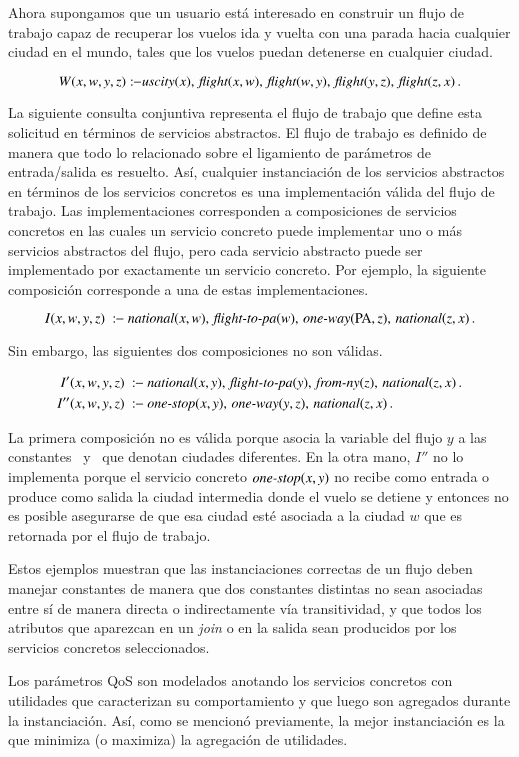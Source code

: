 Ahora supongamos que un usuario está interesado en construir un flujo de trabajo
capaz de recuperar los vuelos ida y vuelta con una parada hacia cualquier ciudad
en el mundo, tales que los vuelos puedan detenerse en cualquier ciudad.

\[ W(x,w,y,z) :\!\!- \text{\it uscity}(x),\,\text{\it flight}(x,w),\,\text{\it flight}(w,y),\,\text{\it flight}(y,z),\,\text{\it flight}(z,x)\,. \]

La siguiente consulta conjuntiva representa el flujo de trabajo que define esta
solicitud en términos de servicios abstractos. El flujo de trabajo es definido
de manera que todo lo relacionado sobre el ligamiento de parámetros de
entrada/salida es resuelto. Así, cualquier instanciación de los servicios
abstractos en términos de los servicios concretos es una implementación válida
del flujo de trabajo. Las implementaciones corresponden a composiciones de
servicios concretos en las cuales un servicio concreto puede implementar uno o
más servicios abstractos del flujo, pero cada servicio abstracto puede ser
implementado por exactamente un servicio concreto. Por ejemplo, la siguiente
composición corresponde a una de estas implementaciones.

\[ I(x,w,y,z)\ \qrule\ \national(x,w),\,\flightPA(w),\,\oneway(\PA,z),\,\national(z,x)\,. \]

Sin embargo, las siguientes dos composiciones no son válidas.

\begin{alignat*}{1}
I'(x,w,y,z)\  \qrule\ &\national(x,y),\,\flightPA(y),\,\fromNY(z),\,\national(z,x)\,. \\
I''(x,w,y,z)\ \qrule\ &\onestop(x,y),\,\oneway(y,z),\,\national(z,x)\,.
\end{alignat*}

La primera composición no es válida porque asocia la variable del flujo $y$ a
las constantes \PA\ y \NY\ que denotan ciudades diferentes. En la otra mano, $I''$
no lo implementa porque el servicio concreto $\text{\it one-stop}(x,y)$ no recibe como entrada
o produce como salida la ciudad intermedia donde el vuelo se detiene y entonces
no es posible asegurarse de que esa ciudad esté asociada a la ciudad $w$ que es
retornada por el flujo de trabajo.

Estos ejemplos muestran que las instanciaciones correctas de un flujo deben
manejar constantes de manera que dos constantes distintas no sean asociadas
entre sí de manera directa o indirectamente vía transitividad, y que todos los
atributos que aparezcan en un \emph{join} o en la salida sean producidos por los
servicios concretos seleccionados.

Los parámetros QoS son modelados anotando los servicios concretos con utilidades
que caracterizan su comportamiento y que luego son agregados durante la
instanciación. Así, como se mencionó previamente, la mejor instanciación es la
que minimiza (o maximiza) la agregación de utilidades.

